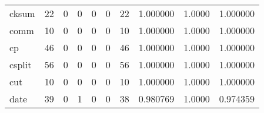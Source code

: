 \begin{longtable}{lrrrrrrrrr}
cksum     &                                       22 &                                                  0 &                                                  0 &                                                  0 &                                                  0 &                                                 22 &                                           1.000000 &                                 1.0000 &                             1.000000 \\
comm      &                                       10 &                                                  0 &                                                  0 &                                                  0 &                                                  0 &                                                 10 &                                           1.000000 &                                 1.0000 &                             1.000000 \\
cp        &                                       46 &                                                  0 &                                                  0 &                                                  0 &                                                  0 &                                                 46 &                                           1.000000 &                                 1.0000 &                             1.000000 \\
csplit    &                                       56 &                                                  0 &                                                  0 &                                                  0 &                                                  0 &                                                 56 &                                           1.000000 &                                 1.0000 &                             1.000000 \\
cut       &                                       10 &                                                  0 &                                                  0 &                                                  0 &                                                  0 &                                                 10 &                                           1.000000 &                                 1.0000 &                             1.000000 \\
date      &                                       39 &                                                  0 &                                                  1 &                                                  0 &                                                  0 &                                                 38 &                                           0.980769 &                                 1.0000 &                             0.974359 \\

\end{longtable}
